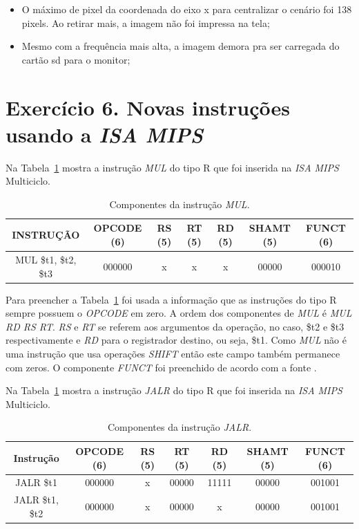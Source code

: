 \documentclass[12pt]{article}
\begin{document}
\begin{itemize}
\item O máximo de pixel da coordenada do eixo x para centralizar o cenário foi 138 pixels. Ao retirar mais, a imagem não foi impressa na tela;
\item Mesmo com a frequência mais alta, a imagem demora pra ser carregada do cartão sd para o monitor;

\end{itemize} 



  
\section{Exercício 6. Novas instruções usando a \textit{ISA MIPS}}
\label{sec:isamips}

Na Tabela~\ref{tab:mul} mostra a instrução \textit{MUL} do tipo R que foi inserida na \textit{ISA MIPS} Multiciclo.

\begin{table}[H]
	\centering
	\begin{tabular}{|c|c|c|c|c|c|c|}
		\hline
		INSTRUÇÃO & OPCODE (6) & RS (5) & RT (5) & RD (5) & SHAMT (5) & FUNCT (6) \\\hline
		MUL \$t1, \$t2, \$t3 & 000000 & x & x & x & 00000 & 000010 \\\hline
	\end{tabular}
	\caption{Componentes da instrução \textit{MUL}.}
	\label{tab:mul}
\end{table}

Para preencher a Tabela~\ref{tab:mul} foi usada a informação que as instruções do tipo R sempre possuem o \textit{OPCODE} em zero. A ordem dos componentes de \textit{MUL} é \textit{MUL RD RS RT}. \textit{RS} e \textit{RT} se referem aos argumentos da operação, no caso, \$t2 e \$t3 respectivamente e \textit{RD} para o registrador destino, ou seja, \$t1. Como \textit{MUL} não é uma instrução que usa operações \textit{SHIFT} então este campo também permanece com zeros. O componente \textit{FUNCT} foi preenchido de acordo com a fonte \cite{mips32}.

Na Tabela~\ref{tab:mul} mostra a instrução \textit{JALR} do tipo R que foi inserida na \textit{ISA MIPS} Multiciclo.

\begin{table}[H]
	\centering
	\begin{tabular}{|c|c|c|c|c|c|c|}
		\hline
		Instrução & OPCODE (6) & RS (5) & RT (5) & RD (5) & SHAMT (5) & FUNCT (6) \\\hline
		JALR \$t1 & 000000 & x & 00000 & 11111 & 00000 & 001001 \\\hline
		JALR \$t1, \$t2 & 000000 & x & 00000 & x & 00000 & 001001 \\\hline
	\end{tabular}
	\caption{Componentes da instrução \textit{JALR}.}
	\label{tab:jalr}
\end{table}
\end{document}
